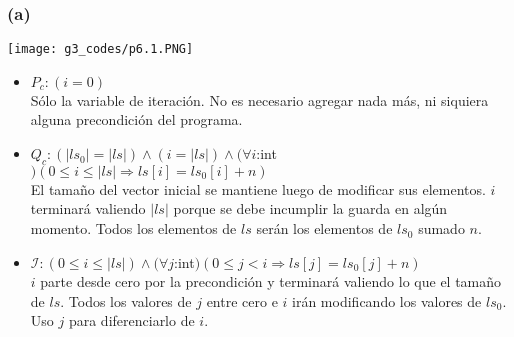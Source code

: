\documentclass[12 pt]{article}
\begin{document}
    \subsubsection*{(a)}
        \begin{center}
            \texttt{[image: g3\_codes/p6.1.PNG]}
        \end{center}
        \begin{itemize}
            \item $P_{c}: (i=0)$
            \\
            Sólo la variable de iteración. No es necesario agregar nada más, ni siquiera alguna precondición del programa.
            \item $Q_{c}: (|ls_{0}| = |ls|) \wedge (i = |ls|) \wedge (\forall i$:int$)(0 \leq i \leq |ls| \Rightarrow ls[i] = ls_{0}[i] + n)$
            \\
            El tamaño del vector inicial se mantiene luego de modificar sus elementos. $i$ terminará valiendo $|ls|$ porque se debe incumplir la guarda en algún momento. Todos los elementos de $ls$ serán los elementos de $ls_{0}$ sumado $n$.
            \item $\mathcal{I}: (0 \leq i \leq |ls|) \wedge (\forall j$:int$)(0 \leq j < i \Rightarrow ls[j] = ls_{0}[j] + n)$
            \\
            $i$ parte desde cero por la precondición y terminará valiendo lo que el tamaño de $ls$. Todos los valores de $j$ entre cero e $i$ irán modificando los valores de $ls_{0}$. Uso $j$ para diferenciarlo de $i$.
        \end{itemize}
\end{document}
